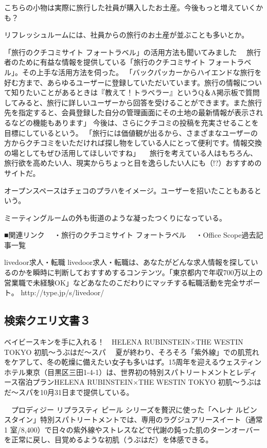 \documentclass[a4paper,12pt]{jsreport}
\begin{document}
こちらの小物は実際に旅行した社員が購入したお土産。今後もっと増えていくかも？

リフレッシュルームには、社員からの旅行のお土産が並ぶことも多いとか。

「旅行のクチコミサイト フォートラベル」の活用方法も聞いてみました 
　旅行者のために有益な情報を提供している「旅行のクチコミサイト フォートラベル」。その上手な活用方法を伺った。
「バックパッカーからハイエンドな旅行を好む方まで、あらゆるユーザーに登録していただいています。旅行の情報について知りたいことがあるときは『教えて！トラベラー』というQ＆A掲示板で質問してみると、旅行に詳しいユーザーから回答を受けることができます。また旅行先を指定すると、会員登録した自分の管理画面にその土地の最新情報が表示されるなどの機能もあります」
今後は、さらにクチコミの投稿を充実させることを目標にしているという。
「旅行には価値観が出るから、さまざまなユーザーの方からクチコミをいただければ探し物をしている人にとって便利です。情報交換の場としてもぜひ活用してほしいですね」
　旅行を考えている人はもちろん、旅行欲を高めたい人、現実からちょっと目を逸らしたい人にも（!?）おすすめのサイトだ。

オープンスペースはチェコのプラハをイメージ。ユーザーを招いたこともあるという。

 ミーティングルームの外も街道のような凝ったつくりになっている。

■関連リンク
　・旅行のクチコミサイト フォートラベル
　・Office Scope過去記事一覧

livedoor求人・転職
livedoor求人・転職は、あなたがどんな求人情報を探しているのかを瞬時に判断しておすすめするコンテンツ。「東京都内で年収700万以上の営業職で未経験OK」などあなたのこだわりにマッチする転職活動を完全サポート。
http://type.jp/s/livedoor/

\newpage
\subsection{検索クエリ文書３}

ベイビースキンを手に入れる！　HELENA RUBINSTEIN×THE WESTIN TOKYO 初肌〜うぶはだ〜スパ
　夏が終わり、そろそろ「紫外線」での肌荒れをケアして、冬の乾燥に備えたい女子も多いはず。15周年を迎えるウェスティンホテル東京（目黒区三田1-4-1）は、世界初の特別スパトリートメントとレディース宿泊プランHELENA RUBINSTEIN×THE WESTIN TOKYO 初肌〜うぶはだ〜スパを10月31日まで提供している。

　プロディジー リプラスティ ピール シリーズを贅沢に使った「ヘレナ ルビンスタイン」特別スパトリートメントでは、専用のラグジュアリースイート（通常1 室/8,400）で日々の紫外線やストレスなどで代謝の鈍った肌のターンオーバーを正常に戻し、目覚めるような初肌（うぶはだ）を体感できる。
\end{document}
